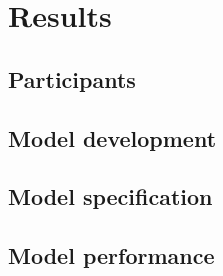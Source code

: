 \documentclass{article}
\begin{document}
\section{Results}\label{sec:results}
\subsection{Participants}\label{sec:participants}



\subsection{Model development}\label{sec:model_development}


\subsection{Model specification}\label{sec:model_specification}


\subsection{Model performance}\label{sec:model_performance}
\end{document}
